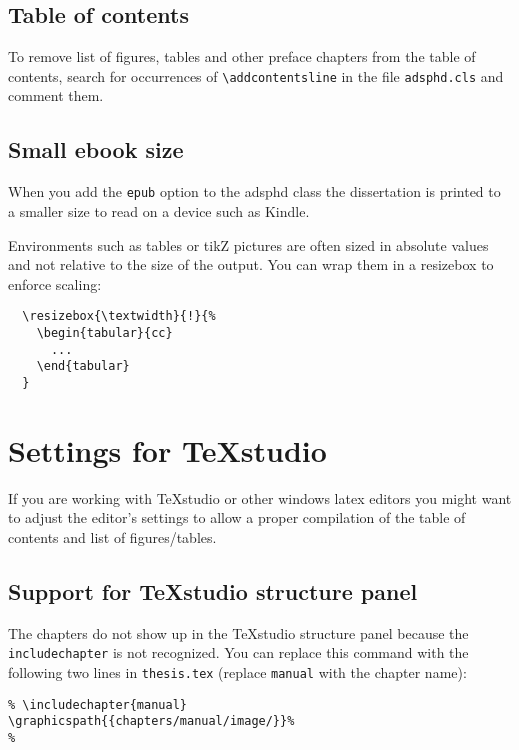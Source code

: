 \subsection{Table of contents}

To remove list of figures, tables and other preface chapters from the table of
contents, search for occurrences of \texttt{\textbackslash addcontentsline} in the file
\texttt{adsphd.cls} and comment them.


\subsection{Small ebook size}

When you add the \texttt{epub} option to the adsphd class the dissertation is
printed to a smaller size to read on a device such as Kindle.

Environments such as tables or tikZ pictures are often sized in absolute values
and not relative to the size of the output. You can wrap them in a resizebox
to enforce scaling:

\begin{verbatim}
  \resizebox{\textwidth}{!}{%
    \begin{tabular}{cc}
      ...
    \end{tabular}
  }
\end{verbatim}

\section{Settings for TeXstudio}

If you are working with TeXstudio or other windows latex editors you might want to adjust the editor's settings to allow a proper compilation of the table of contents and list of figures/tables.


\subsection{Support for TeXstudio structure panel}

The chapters do not show up in the TeXstudio structure panel because the
\texttt{includechapter} is not recognized. You can replace this command 
with the following two lines in \texttt{thesis.tex} (replace \texttt{manual}
with the chapter name):

\begin{verbatim}
% \includechapter{manual}
\graphicspath{{chapters/manual/image/}}%
%
\end{verbatim}


